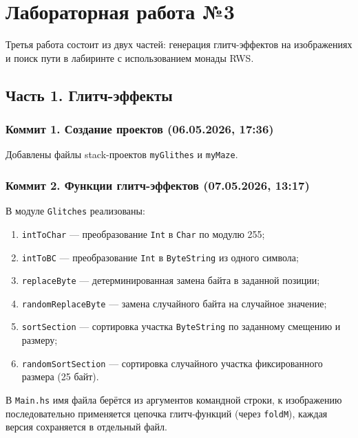 \documentclass[a4paper, final]{article}
\begin{document}
\section{Лабораторная работа №3}

Третья работа состоит из двух частей: генерация глитч-эффектов на изображениях
и поиск пути в лабиринте с использованием монады RWS.

\subsection{Часть 1. Глитч-эффекты}

\subsubsection{Коммит 1. Создание проектов (06.05.2026, 17:36)}

Добавлены файлы stack-проектов \texttt{myGlithes} и \texttt{myMaze}.

\subsubsection{Коммит 2. Функции глитч-эффектов (07.05.2026, 13:17)}

В модуле \texttt{Glitches} реализованы:
\begin{enumerate}[label=\alph*),leftmargin=*]
  \item \texttt{intToChar} — преобразование \texttt{Int} в \texttt{Char} по
        модулю 255;
  \item \texttt{intToBC} — преобразование \texttt{Int} в \texttt{ByteString}
        из одного символа;
  \item \texttt{replaceByte} — детерминированная замена байта в заданной позиции;
  \item \texttt{randomReplaceByte} — замена случайного байта на случайное
        значение;
  \item \texttt{sortSection} — сортировка участка \texttt{ByteString} по
        заданному смещению и размеру;
  \item \texttt{randomSortSection} — сортировка случайного участка
        фиксированного размера (25 байт).
\end{enumerate}
В \texttt{Main.hs} имя файла берётся из аргументов командной строки, к
изображению последовательно применяется цепочка глитч-функций (через
\texttt{foldM}), каждая версия сохраняется в отдельный файл.
\end{document}

